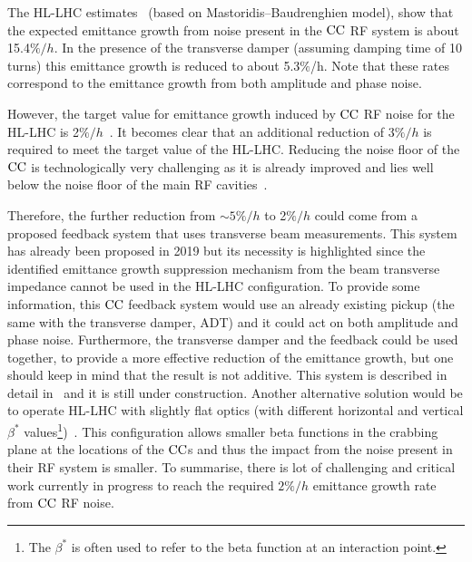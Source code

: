 The HL-LHC estimates~\cite{cc_noise_hl_lhc_estimates} (based on Mastoridis--Baudrenghien model), show that the expected emittance growth from noise present in the ${\mathrm{CC}}$ RF system is about 15.4$\%/h$. In the presence of the transverse damper (assuming damping time of 10 turns) this emittance growth is reduced to about 5.3$\%$/h. Note that these rates correspond to the emittance growth from both amplitude and phase noise. 


However, the target value for emittance growth induced by ${\mathrm{CC}}$ RF noise for the HL-LHC is 2$\%/h$~\cite{MedinaMedrano:2301928, CC_lumi_limits_philippe, CC_lumi_limits_ilias}. It becomes clear that an additional reduction of 3$\%/h$ is required to meet the target value of the HL-LHC. Reducing the noise floor of the ${\mathrm{CC}}$ is technologically very challenging as it is already improved and lies well below the noise floor of the main RF cavities~\cite{cc_noise_hl_lhc_estimates}. %


Therefore, the further reduction from $\sim 5\%/h$ to 2$\%/h$ could come from a proposed feedback system that uses transverse beam measurements. This system has already been proposed in 2019 but its necessity is highlighted since the identified emittance growth suppression mechanism from the beam transverse impedance cannot be used in the HL-LHC configuration. To provide some information, this ${\mathrm{CC}}$ feedback system would use an already existing pickup (the same with the transverse damper, ADT) and it could act on both amplitude and phase noise.  Furthermore, the transverse damper and the feedback could be used together, to provide a more effective reduction of the emittance growth, but one should keep in mind that the result is not additive. This system is described in detail in~\cite{Baudrenghien:2665950} and it is still under construction. %
Another alternative solution would be to operate HL-LHC with slightly flat optics (with different horizontal and vertical $\beta^{\ast}$ values\footnote{The $\beta^{\ast}$ is often used to refer to the beta function at an interaction point.})~\cite{elias_run4_op}. %
This configuration allows smaller beta functions in the crabbing plane at the locations of the ${\mathrm{CC}}$s and thus the impact from the noise present in their RF system is smaller. To summarise, there is lot of challenging and critical work currently in progress to reach the required $2\%/h$ emittance growth rate from ${\mathrm{CC}}$ RF noise.

